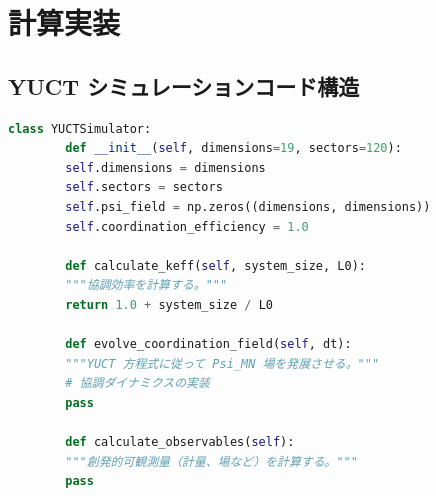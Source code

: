 \documentclass[11pt,a4paper]{article}
\theoremstyle{remark}
\begin{document}
	\section{計算実装}
	\label{app:computational}
	
	\subsection{YUCT シミュレーションコード構造}
	
	\begin{lstlisting}[language=Python, caption={YUCT シミュレーションフレームワーク}, label={lst:simulation}]
		class YUCTSimulator:
		def __init__(self, dimensions=19, sectors=120):
		self.dimensions = dimensions
		self.sectors = sectors
		self.psi_field = np.zeros((dimensions, dimensions))
		self.coordination_efficiency = 1.0
		
		def calculate_keff(self, system_size, L0):
		"""協調効率を計算する。"""
		return 1.0 + system_size / L0
		
		def evolve_coordination_field(self, dt):
		"""YUCT 方程式に従って Psi_MN 場を発展させる。"""
		# 協調ダイナミクスの実装
		pass
		
		def calculate_observables(self):
		"""創発的可観測量（計量、場など）を計算する。"""
		pass
	\end{lstlisting}
	
\end{document}
